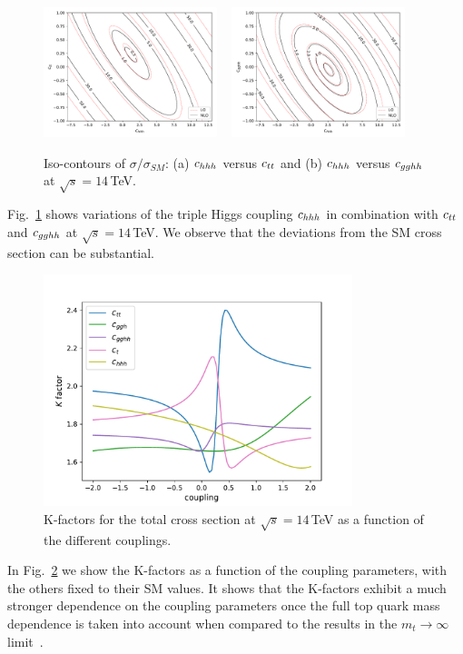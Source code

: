 %
\begin{figure}[ht]
\begin{center}
\includegraphics[width=0.45\textwidth]{section3/plots/plot_chhh_ctt.pdf}    
~
\includegraphics[width=0.45\textwidth]{section3/plots/plot_chhh_cgghh.pdf}
\end{center}
\caption{Iso-contours of $\sigma/\sigma_{SM}$: (a) $c_{hhh}$ versus $c_{tt}$ and (b) $c_{hhh}$ versus $c_{gghh}$  at $\sqrt{s}=14$\,TeV.}
\label{fig:chhh_ctt_cgg}
\end{figure}

Fig.~\ref{fig:chhh_ctt_cgg} shows variations of the triple Higgs coupling $c_{hhh}$ in combination with $c_{tt}$ and $c_{gghh}$ at $\sqrt{s}=14$\,TeV.
We observe that the deviations from the SM cross section can be substantial.
%
\begin{figure}[ht]
\begin{center}
\includegraphics[width=9cm]{section3/plots/Kplot.pdf}
\end{center}
\caption{K-factors for the total cross section at $\sqrt{s}=14$\,TeV as a function of the
  different couplings.}
\label{fig:project_ctt}
\end{figure}
%
In Fig.~\ref{fig:project_ctt} we show the K-factors as a function of
the coupling parameters, with the others fixed to their SM values. 
It shows that the K-factors exhibit a much stronger dependence on the
coupling parameters once the full top quark mass dependence is taken into account when compared to 
the results in the $m_t\to\infty$ limit~\cite{Grober:2015cwa,deFlorian:2017qfk}.
%

